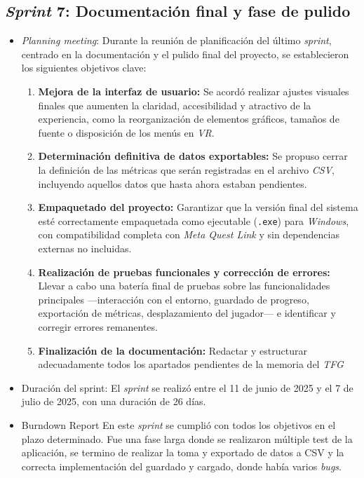 \subsection{\textbf{\textit{Sprint} 7: 
Documentación final y fase de pulido}}
\begin{itemize}
\item \textit{Planning meeting}:
Durante la reunión de planificación del último \textit{sprint}, centrado en la documentación y el pulido final del proyecto, se establecieron los siguientes objetivos clave:

\begin{enumerate}
  \item \textbf{Mejora de la interfaz de usuario:}  
    Se acordó realizar ajustes visuales finales que aumenten la claridad, accesibilidad y atractivo de la experiencia, como la reorganización de elementos gráficos, tamaños de fuente o disposición de los menús en \textit{VR}.

  \item \textbf{Determinación definitiva de datos exportables:}  
    Se propuso cerrar la definición de las métricas que serán registradas en el archivo \textit{CSV}, incluyendo aquellos datos que hasta ahora estaban pendientes.

  \item \textbf{Empaquetado del proyecto:}  
    Garantizar que la versión final del sistema esté correctamente empaquetada como ejecutable (\texttt{.exe}) para \textit{Windows}, con compatibilidad completa con \textit{Meta Quest Link} y sin dependencias externas no incluidas.

  \item \textbf{Realización de pruebas funcionales y corrección de errores:}  
    Llevar a cabo una batería final de pruebas sobre las funcionalidades principales —interacción con el entorno, guardado de progreso, exportación de métricas, desplazamiento del jugador— e identificar y corregir errores remanentes.

  \item \textbf{Finalización de la documentación:}  
    Redactar y estructurar adecuadamente todos los apartados pendientes de la memoria del \textit{TFG}
\end{enumerate}

    \item {Duración del sprint:}
El \textit{sprint } se realizó entre el 11 de junio de 2025 y el 7 de julio de 2025, con una duración de 26 días.

    \item {Burndown Report}
En este \textit{sprint} se cumplió con todos los objetivos en el plazo determinado. Fue una fase larga donde se realizaron múltiple test de la aplicación, se termino de realizar la toma y exportado de datos a CSV y la correcta implementación del guardado y cargado, donde había varios \textit{bugs}.


\end{itemize}


